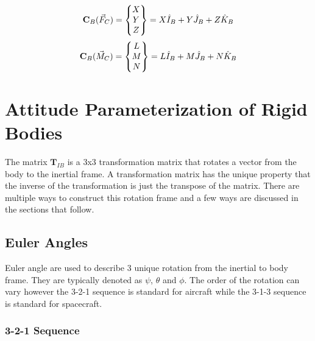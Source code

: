\documentclass{article}
\begin{document}
\begin{equation}
{\bf C}_B(\vec{F}_{C}) = \begin{Bmatrix} X \\ Y
  \\ Z \end{Bmatrix} = X \hat{I}_B + Y \hat{J}_B + Z \hat{K}_B
\end{equation}
\begin{equation}
{\bf C}_B(\vec{M}_{C}) = \begin{Bmatrix} L \\ M
  \\ N \end{Bmatrix} = L \hat{I}_B + M \hat{J}_B + N \hat{K}_B
\end{equation}

\section{Attitude Parameterization of Rigid Bodies}

The matrix $\textbf{T}_{IB}$ is a 3x3 transformation matrix that
rotates a vector from the body to the inertial frame. A transformation
matrix has the unique property that the inverse of the transformation
is just the transpose of the matrix. There are multiple ways to
construct this rotation frame and a few ways are discussed in the
sections that follow. 

\subsection{Euler Angles}\label{s:Euler_Angles}

Euler angle are used to describe 3 unique rotation from the inertial
to body frame. They are typically denoted as $\psi$, $\theta$ and
$\phi$. The order of the rotation can vary however the 3-2-1 sequence
is standard for aircraft while the 3-1-3 sequence is standard for
spacecraft. 

\subsubsection{3-2-1 Sequence}
\end{document}

